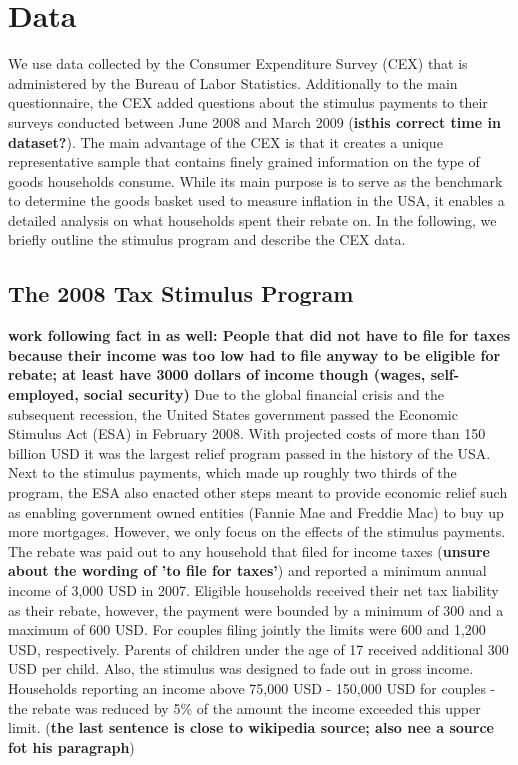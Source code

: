 \newpage
\section{Data} \label{sec:data}
We use data collected by the Consumer Expenditure Survey (CEX) that is administered by the Bureau of Labor Statistics. Additionally to the main questionnaire, the CEX added questions about the stimulus payments to their surveys conducted between June 2008 and March 2009 (\textbf{isthis correct time in dataset?}). The main advantage of the CEX is that it creates a unique representative sample that contains finely grained information on the type of goods households consume. While its main purpose is to serve as the benchmark to determine the goods basket used to measure inflation in the USA, it enables a detailed analysis on what households spent their rebate on. In the following, we briefly outline the stimulus program and describe the CEX data. 

\subsection{The 2008 Tax Stimulus Program} 
\textbf{work following fact in as well: People that did not have to file for taxes because their income was too low had to file anyway to be eligible for rebate; at least have 3000 dollars of income though (wages, self-employed, social security)}
Due to the global financial crisis and the subsequent recession, the United States government passed the Economic Stimulus Act (ESA) in February 2008. With projected costs of more than 150 billion USD it was the largest relief program passed in the history of the USA. Next to the stimulus payments, which made up roughly two thirds of the program, the ESA also enacted other steps meant to provide economic relief such as enabling government owned entities (Fannie Mae and Freddie Mac) to buy up more mortgages. However, we only focus on the effects of the stimulus payments. \\
The rebate was paid out to any household that filed for income taxes (\textbf{unsure about the wording of 'to file for taxes'}) and reported a minimum annual income of 3,000 USD in 2007. Eligible households received their net tax liability as their rebate, however, the payment were bounded by a minimum of 300 and a maximum of 600 USD. For couples filing jointly the limits were 600 and 1,200 USD, respectively. Parents of children under the age of 17 received additional 300 USD per child. Also, the stimulus was designed to fade out in gross income. Households reporting an income above 75,000 USD - 150,000 USD for couples -  
the rebate was reduced by 5\% of the amount the income exceeded this upper limit. (\textbf{the last sentence is close to wikipedia source; also nee a source fot his paragraph}) 

